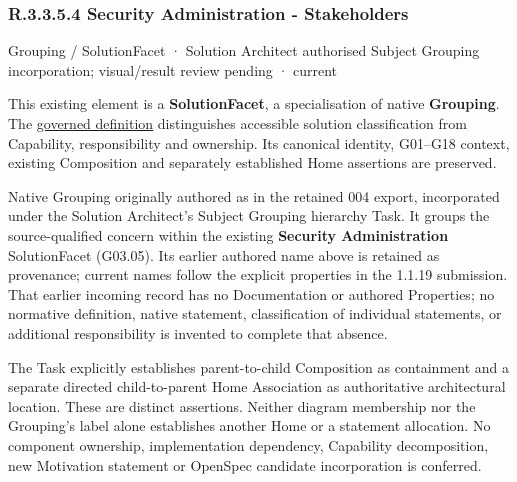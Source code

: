 \subsubsection*{R.3.3.5.4 Security Administration - Stakeholders}
\label{navigation:R.3.3.5.4}

\label{element:980b414d73614bd48bc47a6aaa718a51}
{\small Grouping / SolutionFacet · Solution Architect authorised Subject Grouping incorporation; visual/result review pending · current}\par

This existing element is a \textbf{SolutionFacet}, a specialisation of native
\textbf{Grouping}. The \href{\detokenize{../../../../../../../governance/continuum-representation.md#solutionfacet-classification--1119-candidate}}{governed definition}
distinguishes accessible solution classification from Capability, responsibility
and ownership. Its canonical identity, G01–G18 context, existing Composition
and separately established Home assertions are preserved.



Native Grouping originally authored as \texttt{} in the retained 004 export,
incorporated under the Solution Architect's Subject Grouping hierarchy Task.
It groups the source-qualified \texttt{} concern within
the existing \textbf{Security Administration} SolutionFacet (G03.05). Its earlier authored name above is retained as provenance; current names
follow the explicit properties in the 1.1.19 submission.
That earlier incoming record has no Documentation or authored Properties; no normative
definition, native statement, classification of individual statements, or
additional responsibility is invented to complete that absence.



The Task explicitly establishes parent-to-child Composition as containment and
a separate directed child-to-parent Home Association as authoritative architectural
location. These are distinct assertions. Neither diagram membership nor the
Grouping's label alone establishes another Home or a statement allocation.
No component ownership, implementation dependency, Capability decomposition,
new Motivation statement or OpenSpec candidate incorporation is conferred.




